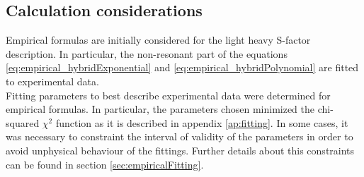\documentclass[openany]{book}
\begin{document}



 
 
 
\subsection{Calculation considerations} \label{sub:considerationsNonResonant}

Empirical formulas are initially considered for the light heavy S-factor description. In particular, the non-resonant part of the equations \ref{eq:empirical_hybridExponential}  and \ref{eq:empirical_hybridPolynomial} are fitted to experimental data.  \\

Fitting parameters to best describe experimental data were determined for empirical formulas. In particular, the parameters chosen minimized the chi-squared $\chi^2$ function as it is described in appendix \ref{ap:fitting}. In some cases, it was necessary to constraint the interval of validity of the parameters in order to avoid unphysical behaviour of the fittings. Further details about this constraints can be found in section \ref{sec:empiricalFitting}. \\
\end{document}
